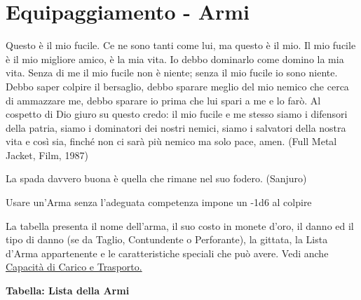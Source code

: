 \section{Equipaggiamento - Armi}\label{equipaggiamentoarmi}
\hypertarget{equipaggiamento.armi}{}

\label{equipaggiamento---armi}
\begin{changemargin}{0.3cm}{0.3cm}\begin{enfasi}{
Questo è il mio fucile. Ce ne sono tanti come lui, ma questo è il mio. Il mio fucile è il mio migliore amico, è la mia vita. Io debbo dominarlo come domino la mia vita. Senza di me il mio fucile non è niente; senza il mio fucile io sono niente. Debbo saper colpire il bersaglio, debbo sparare meglio del mio nemico che cerca di ammazzare me, debbo sparare io prima che lui spari a me e lo farò. Al cospetto di Dio giuro su questo credo: il mio fucile e me stesso siamo i difensori della patria, siamo i dominatori dei nostri nemici, siamo i salvatori della nostra vita e così sia, finché non ci sarà più nemico ma solo pace, amen. (Full Metal Jacket, Film, 1987)

\medskip

La spada davvero buona è quella che rimane nel suo fodero. (Sanjuro)}\end{enfasi}\end{changemargin}

\medskip

Usare un'Arma senza l'adeguata competenza impone un -1d6 al colpire

La tabella presenta il nome dell'arma, il suo costo in monete d'oro, il danno ed il tipo di danno (se da Taglio, Contundente o Perforante), la gittata, la Lista d'Arma appartenente e le caratteristiche speciali che può avere. Vedi anche \hyperref[sec:capacita-di-carico-e-trasporto-ingombro]{Capacità di Carico e Trasporto.}

\medskip

\textbf{Tabella: Lista della Armi}

